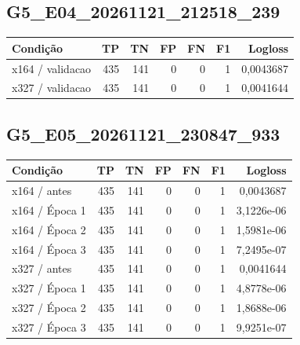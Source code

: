 \subsection{G5\_E04\_20261121\_212518\_239}
\small\begin{longtable}{@{}p{.38\linewidth}rrrrrr@{}}
\toprule Condição & TP & TN & FP & FN & F1 & Logloss\\\midrule\endhead
x164 /\allowbreak{} validacao & 435 & 141 & 0 & 0 & 1 & 0,0043687\\
x327 /\allowbreak{} validacao & 435 & 141 & 0 & 0 & 1 & 0,0041644\\
\bottomrule\end{longtable}\normalsize

\subsection{G5\_E05\_20261121\_230847\_933}
\small\begin{longtable}{@{}p{.38\linewidth}rrrrrr@{}}
\toprule Condição & TP & TN & FP & FN & F1 & Logloss\\\midrule\endhead
x164 /\allowbreak{} antes & 435 & 141 & 0 & 0 & 1 & 0,0043687\\
x164 /\allowbreak{} Época 1 & 435 & 141 & 0 & 0 & 1 & 3,1226e-06\\
x164 /\allowbreak{} Época 2 & 435 & 141 & 0 & 0 & 1 & 1,5981e-06\\
x164 /\allowbreak{} Época 3 & 435 & 141 & 0 & 0 & 1 & 7,2495e-07\\
x327 /\allowbreak{} antes & 435 & 141 & 0 & 0 & 1 & 0,0041644\\
x327 /\allowbreak{} Época 1 & 435 & 141 & 0 & 0 & 1 & 4,8778e-06\\
x327 /\allowbreak{} Época 2 & 435 & 141 & 0 & 0 & 1 & 1,8688e-06\\
x327 /\allowbreak{} Época 3 & 435 & 141 & 0 & 0 & 1 & 9,9251e-07\\
\bottomrule\end{longtable}\normalsize

